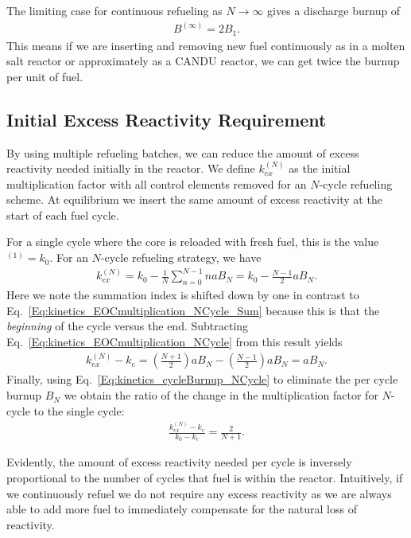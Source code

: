 The limiting case for continuous refueling as $N \rightarrow \infty$ gives a discharge burnup of
\begin{align}
  B^{(\infty)} = 2 B_1 .
\end{align}
This means if we are inserting and removing new fuel continuously as in a molten salt reactor or approximately as a CANDU reactor, we can get twice the burnup per unit of fuel.

\subsection{Initial Excess Reactivity Requirement}

By using multiple refueling batches, we can reduce the amount of excess reactivity needed initially in the reactor. We define $k_{ex}^{(N)}$ as the initial multiplication factor with all control elements removed for an $N$-cycle refueling scheme. At equilibrium we insert the same amount of excess reactivity at the start of each fuel cycle. 

For a single cycle where the core is reloaded with fresh fuel, this is the value $^{(1)} = k_0$. For an $N$-cycle refueling strategy, we have
\begin{align}
  k_{ex}^{(N)} = k_0 - \frac{1}{N} \sum_{n=0}^{N-1} n a B_N = k_0 - \frac{ N - 1 }{ 2 } a B_N .
\end{align}
Here we note the summation index is shifted down by one in contrast to Eq.~\eqref{Eq:kinetics_EOCmultiplication_NCycle_Sum} because this is that the \emph{beginning} of the cycle versus the end. Subtracting Eq.~\eqref{Eq:kinetics_EOCmultiplication_NCycle} from this result yields
\begin{align}
  k_{ex}^{(N)} - k_e = \left( \frac{ N + 1 }{ 2 } \right) a B_N  - \left( \frac{N-1}{2} \right) a B_N = a B_N .
\end{align}
Finally, using Eq.~\eqref{Eq:kinetics_cycleBurnup_NCycle} to eliminate the per cycle burnup $B_N$ we obtain the ratio of the change in the multiplication factor for $N$-cycle to the single cycle:
\begin{align}
  \frac{ k_{ex}^{(N)} - k_e }{ k_0 - k_e } = \frac{2}{N+1} .
\end{align}

Evidently, the amount of excess reactivity needed per cycle is inversely proportional to the number of cycles that fuel is within the reactor. Intuitively, if we continuously refuel we do not require any excess reactivity as we are always able to add more fuel to immediately compensate for the natural loss of reactivity.

